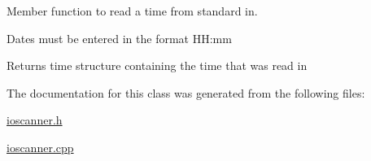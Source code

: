 \-Member function to read a time from standard in. 

\-Dates must be entered in the format \-H\-H\-:mm \begin{DoxyReturn}{\-Returns}
time structure containing the time that was read in 
\end{DoxyReturn}


\-The documentation for this class was generated from the following files\-:\begin{DoxyCompactItemize}
\item 
\hyperlink{ioscanner_8h}{ioscanner.\-h}\item 
\hyperlink{ioscanner_8cpp}{ioscanner.\-cpp}\end{DoxyCompactItemize}
